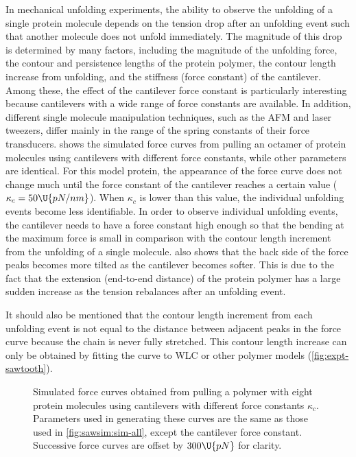 In mechanical unfolding experiments, the ability to observe the
unfolding of a single protein molecule depends on the tension drop
after an unfolding event such that another molecule does not unfold
immediately.  The magnitude of this drop is determined by many
factors, including the magnitude of the unfolding force, the contour
and persistence lengths of the protein polymer, the contour length
increase from unfolding, and the stiffness (force constant) of the
cantilever.  Among these, the effect of the cantilever force constant
is particularly interesting because cantilevers with a wide range of
force constants are available.  In addition, different single molecule
manipulation techniques, such as the AFM and laser tweezers, differ
mainly in the range of the spring constants of their force
transducers\citep{walton08}.   shows
the simulated force curves from pulling an octamer of protein
molecules using cantilevers with different force constants, while
other parameters are identical.  For this model protein, the
appearance of the force curve does not change much until the force
constant of the cantilever reaches a certain value
($\kappa_c=50\U{pN/nm}$).  When $\kappa_c$ is lower than this value,
the individual unfolding events become less identifiable.  In order to
observe individual unfolding events, the cantilever needs to have a
force constant high enough so that the bending at the maximum force is
small in comparison with the contour length increment from the
unfolding of a single molecule.   also
shows that the back side of the force peaks becomes more tilted as the
cantilever becomes softer.  This is due to the fact that the extension
(end-to-end distance) of the protein polymer has a large sudden
increase as the tension rebalances after an unfolding event.

It should also be mentioned that the contour length increment from
each unfolding event is not equal to the distance between adjacent
peaks in the force curve because the chain is never fully stretched.
This contour length increase can only be obtained by fitting the curve
to WLC or other polymer models (\cref{fig:expt-sawtooth}).

\begin{figure}
\begin{center}
\caption{Simulated force curves obtained from pulling a polymer with
  eight protein molecules using cantilevers with different force
  constants $\kappa_c$.  Parameters used in generating these curves
  are the same as those used in \cref{fig:sawsim:sim-all}, except the
  cantilever force constant.  Successive force curves are offset by
  $300\U{pN}$ for clarity.\label{fig:sawsim:kappa-sawteeth}}
\end{center}
\end{figure}

